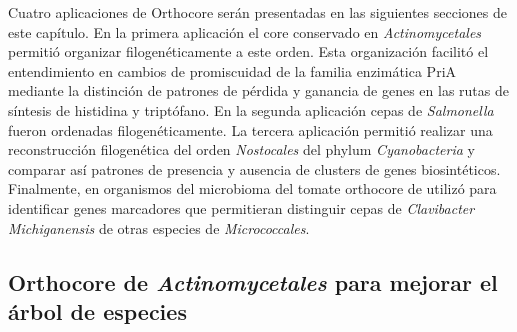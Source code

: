 \documentclass[12pt,twoside]{reedthesis}
\begin{document}
  Cuatro aplicaciones de Orthocore serán presentadas en las siguientes
  secciones de este capítulo. En la primera aplicación el core conservado
  en \emph{Actinomycetales} permitió organizar filogenéticamente a este
  orden. Esta organización facilitó el entendimiento en cambios de
  promiscuidad de la familia enzimática PriA mediante la distinción de
  patrones de pérdida y ganancia de genes en las rutas de síntesis de
  histidina y triptófano. En la segunda aplicación cepas de
  \emph{Salmonella} fueron ordenadas filogenéticamente. La tercera
  aplicación permitió realizar una reconstrucción filogenética del orden
  \emph{Nostocales} del phylum \emph{Cyanobacteria} y comparar así
  patrones de presencia y ausencia de clusters de genes biosintéticos.
  Finalmente, en organismos del microbioma del tomate orthocore de utilizó
  para identificar genes marcadores que permitieran distinguir cepas de
  \emph{Clavibacter Michiganensis} de otras especies de
  \emph{Micrococcales}.
  
  \subsection{\texorpdfstring{Orthocore de \emph{Actinomycetales} para
  mejorar el árbol de
  especies}{Orthocore de Actinomycetales para mejorar el árbol de especies}}\label{orthocore-de-actinomycetales-para-mejorar-el-arbol-de-especies}
  
\end{document}
